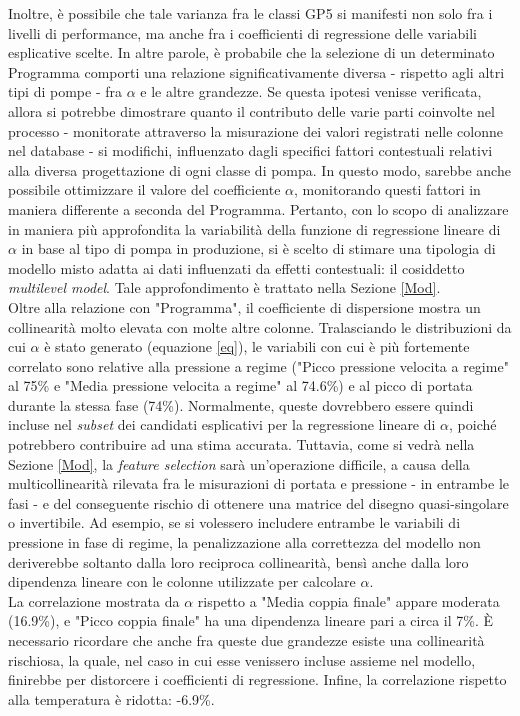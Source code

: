 \documentclass[fleqn,10pt]{SelfArx} %
\begin{document}
Inoltre, è possibile che tale varianza fra le classi GP5 si manifesti non solo fra i livelli di performance, ma anche fra i coefficienti di regressione delle variabili esplicative scelte. In altre parole, è probabile che la selezione di un determinato Programma comporti una relazione significativamente diversa - rispetto agli altri tipi di pompe - fra $\alpha$ e le altre grandezze. Se questa ipotesi venisse verificata, allora si potrebbe dimostrare quanto il contributo delle varie parti coinvolte nel processo - monitorate attraverso la misurazione dei valori registrati nelle colonne nel database - si modifichi, influenzato dagli specifici fattori contestuali relativi alla diversa progettazione di ogni classe di pompa. In questo modo, sarebbe anche possibile ottimizzare il valore del coefficiente $\alpha$, monitorando questi fattori in maniera differente a seconda del Programma. Pertanto, con lo scopo di analizzare in maniera più approfondita la variabilità della funzione di regressione lineare di $\alpha$ in base al tipo di pompa in produzione, si è scelto di stimare una tipologia di modello misto adatta ai dati influenzati da effetti contestuali: il cosiddetto \textit{multilevel model}. Tale approfondimento è trattato nella Sezione \ref{Mod}.\\
Oltre alla relazione con "Programma", il coefficiente di dispersione mostra un collinearità molto elevata con molte altre colonne. Tralasciando le distribuzioni da cui $\alpha$ è stato generato (equazione \ref{eq}), le variabili con cui è più fortemente correlato sono relative alla pressione a regime ("Picco pressione velocita a regime" al 75\% e "Media pressione velocita a regime" al 74.6\%) e al picco di portata durante la stessa fase (74\%). Normalmente, queste dovrebbero essere quindi incluse nel \textit{subset} dei candidati esplicativi per la regressione lineare di $\alpha$, poiché potrebbero contribuire ad una stima accurata. Tuttavia, come si vedrà nella Sezione \ref{Mod}, la \textit{feature selection} sarà un'operazione difficile, a causa della multicollinearità rilevata fra le misurazioni di portata e pressione - in entrambe le fasi - e del conseguente rischio di ottenere una matrice del disegno quasi-singolare o invertibile. Ad esempio, se si volessero includere entrambe le variabili di pressione in fase di regime, la penalizzazione alla correttezza del modello non deriverebbe soltanto dalla loro reciproca collinearità, bensì anche dalla loro dipendenza lineare con le colonne utilizzate per calcolare $\alpha$.\\
La correlazione mostrata da $\alpha$ rispetto a "Media coppia finale" appare moderata (16.9\%), e "Picco coppia finale" ha una dipendenza lineare pari a circa il 7\%. È necessario ricordare che anche fra queste due grandezze esiste una collinearità rischiosa, la quale, nel caso in cui esse venissero incluse assieme nel modello, finirebbe per distorcere i coefficienti di regressione. Infine, la correlazione rispetto alla temperatura è ridotta: -6.9\%.\\
\end{document}
